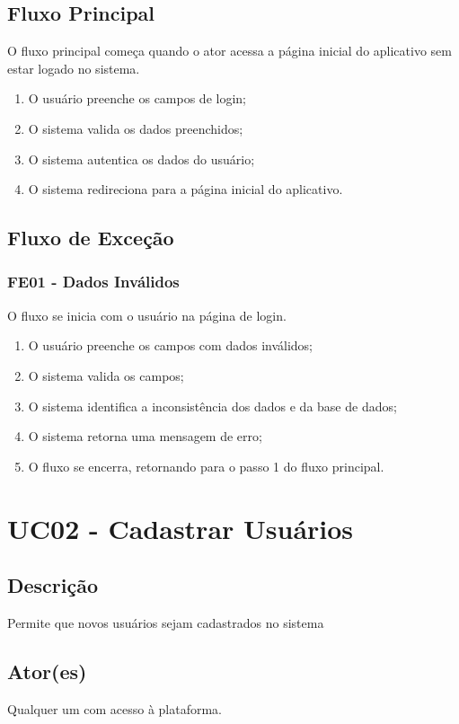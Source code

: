 \begin{anexosenv}
    \subsection{Fluxo Principal}
        O fluxo principal começa quando o ator acessa a página inicial do aplicativo sem estar logado no sistema.
        \begin{enumerate}
            \item O usuário preenche os campos de login;
            \item O sistema valida os dados preenchidos;
            \item O sistema autentica os dados do usuário;
            \item O sistema redireciona para a página inicial do aplicativo.
        \end{enumerate}
    \subsection{Fluxo de Exceção}
        \subsubsection{FE01 \-- Dados Inválidos}
        O fluxo se inicia com o usuário na página de login.
            \begin{enumerate}
                \item O usuário preenche os campos com dados inválidos;
                \item O sistema valida os campos;
                \item O sistema identifica a inconsistência dos dados e da base de dados;
                \item O sistema retorna uma mensagem de erro;
                \item O fluxo se encerra, retornando para o passo 1 do fluxo principal.
            \end{enumerate}

\section{UC02 \-- Cadastrar Usuários}
    \subsection{Descrição}
        Permite que novos usuários sejam cadastrados no sistema
    \subsection{Ator(es)}
        Qualquer um com acesso à plataforma.

\end{anexosenv}
